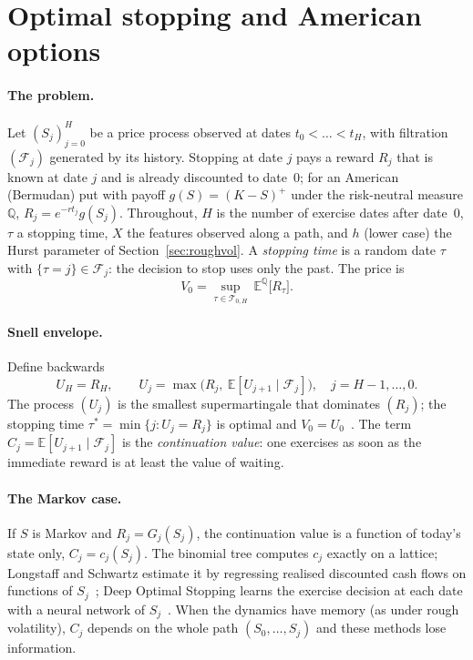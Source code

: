 \section{Optimal stopping and American options}
\label{sec:theory}

\paragraph{The problem.}
Let $(S_j)_{j=0}^{H}$ be a price process observed at dates $t_0<\dots<t_H$, with
filtration $(\mathcal F_j)$ generated by its history. Stopping at date $j$ pays a reward
$R_j$ that is known at date $j$ and is already discounted to date~0; for an American
(Bermudan) put with payoff $g(S)=(K-S)^+$ under the risk-neutral measure $\mathbb Q$,
$R_j=e^{-rt_j}g(S_j)$. Throughout, $H$ is the number of exercise dates after date~0, $\tau$
a stopping time, $X$ the features observed along a path, and $h$ (lower case) the Hurst
parameter of Section~\ref{sec:roughvol}. A \emph{stopping time} is a random date
$\tau$ with $\{\tau=j\}\in\mathcal F_j$: the decision to stop uses only the past. The price is
\begin{equation}
V_0=\sup_{\tau\in\mathcal T_{0,H}}\ \mathbb E^{\mathbb Q}\big[R_\tau\big].
\end{equation}

\paragraph{Snell envelope.}
Define backwards
\begin{equation}
U_H=R_H,\qquad U_j=\max\big(R_j,\ \mathbb E[U_{j+1}\mid\mathcal F_j]\big),\quad j=H-1,\dots,0 .
\label{eq:snell}
\end{equation}
The process $(U_j)$ is the smallest supermartingale that dominates $(R_j)$; the stopping
time $\tau^*=\min\{j:U_j=R_j\}$ is optimal and $V_0=U_0$~\cite{shreve2}. The term
$C_j=\mathbb E[U_{j+1}\mid\mathcal F_j]$ is the \emph{continuation value}: one exercises
as soon as the immediate reward is at least the value of waiting.

\paragraph{The Markov case.}
If $S$ is Markov and $R_j=G_j(S_j)$, the continuation value is a function of today's state
only, $C_j=c_j(S_j)$. The binomial tree computes $c_j$ exactly on a lattice; Longstaff and
Schwartz estimate it by regressing realised discounted cash flows on functions of
$S_j$~\cite{ls2001}; Deep Optimal Stopping learns the exercise decision at each date with a
neural network of $S_j$~\cite{becker2019}. When the dynamics have memory (as under rough
volatility), $C_j$ depends on the whole path $(S_0,\dots,S_j)$ and these methods lose
information.

